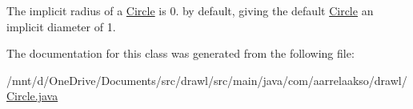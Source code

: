 The implicit radius of a \hyperlink{classcom_1_1aarrelaakso_1_1drawl_1_1_circle}{Circle} is 0. by default, giving the default \hyperlink{classcom_1_1aarrelaakso_1_1drawl_1_1_circle}{Circle} an implicit diameter of 1. 



The documentation for this class was generated from the following file\+:\begin{DoxyCompactItemize}
\item 
/mnt/d/\+One\+Drive/\+Documents/src/drawl/src/main/java/com/aarrelaakso/drawl/\hyperlink{_circle_8java}{Circle.\+java}\end{DoxyCompactItemize}
